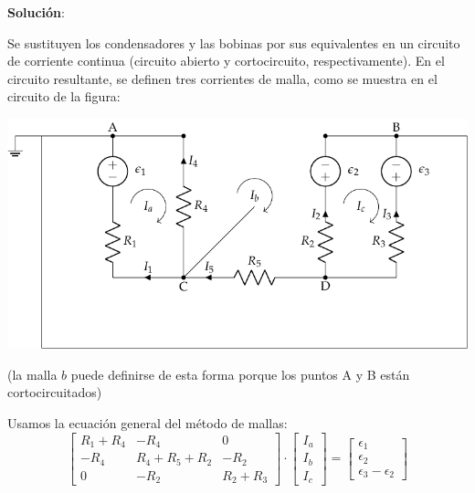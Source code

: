 \documentclass[10pt]{article}
\begin{document}
\vspace{3mm}

\hrulefill

\vspace{5mm}
\textbf{Solución}:
\vspace{4mm}

Se sustituyen los condensadores y las bobinas por sus equivalentes en un circuito de corriente continua (circuito abierto y cortocircuito, respectivamente). En el circuito resultante, se definen tres corrientes de malla, como se muestra en el circuito de la figura:

\begin{center}
  \includegraphics[scale=1.08]{figs/mallas_condensadores_sol.pdf}
\end{center}
(la malla $b$ puede definirse de esta forma porque los puntos A y B están cortocircuitados)

\vspace{4mm}
Usamos la ecuación general del método de mallas:    
\begin{equation*}
    \begin{bmatrix}
        R_1 + R_4 & -R_4 & 0\\
        -R_4 & R_4 + R_5 + R_2 & -R_{2}\\
        0 & -R_2 & R_2 + R_3
    \end{bmatrix} \cdot %
    \begin{bmatrix}
        I_{a}\\
        I_{b}\\
        I_{c}
    \end{bmatrix} = %
    \begin{bmatrix}
        \epsilon_1\\
        \epsilon_2\\
        \epsilon_3 - \epsilon_2
    \end{bmatrix}
\end{equation*} 
\end{document}
